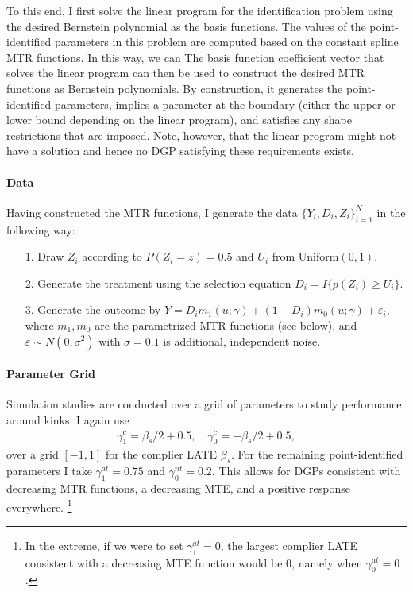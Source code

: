 \documentclass[12pt,a4paper,english]{article} %
\numberwithin{equation}{section}
\theoremstyle{definition}
\theoremstyle{remark}
\theoremstyle{plain}
\begin{document}
To this end, I first solve the linear program for the identification problem using the desired Bernstein polynomial as the basis functions.
The values of the point-identified parameters in this problem are computed based on the constant spline MTR functions. In this way, we can
The basis function coefficient vector that solves the linear program can then be used to construct the desired MTR functions as Bernstein polynomials.
By construction, it generates the point-identified parameters, implies a parameter at the boundary (either the upper or lower bound depending on the linear program), and satisfies any shape restrictions that are imposed.
Note, however, that the linear program might not have a solution and hence no DGP satisfying these requirements exists.

\paragraph{Data}
Having constructed the MTR functions, I generate the data $\{Y_i, D_i, Z_i\}_{i=1}^N$ in the following way:
\begin{itemize}
  \item[1.] Draw $Z_i$ according to $P(Z_i=z) = 0.5$ and $U_i$ from $\text{Uniform}(0,1)$.
  \item[2.] Generate the treatment using the selection equation $D_i = I\{p(Z_i) \geq U_i\}$.
  \item[3.] Generate the outcome by $Y = D_i m_1(u; \gamma) + (1 - D_i) m_0(u; \gamma) + \varepsilon_i$,
  where $m_1, m_0$ are the parametrized MTR functions (see below), and $\varepsilon\sim N(0, \sigma^2)$ with $\sigma=0.1$ is additional, independent noise.
\end{itemize}

\paragraph{Parameter Grid}
Simulation studies are conducted over a grid of parameters to study performance around kinks.
I again use
\begin{align}
  \gamma_1^c = \beta_s / 2 + 0.5, \quad \gamma_0^c = -\beta_s / 2 + 0.5,
\end{align}
over a grid $[-1, 1]$ for the complier LATE $\beta_s$.
For the remaining point-identified parameters I take $\gamma_1^{at} = 0.75$ and $\gamma_0^{nt} = 0.2$.
This allows for DGPs consistent with decreasing MTR functions, a decreasing MTE, and a positive response everywhere.
\footnote{In the extreme, if we were to set $\gamma_1^{at} = 0$, the largest complier LATE consistent with a decreasing MTE function would be $0$, namely when $\gamma_0^{at}=0$.}
\end{document}
